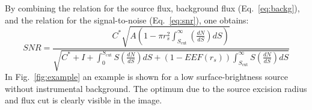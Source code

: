\documentclass[10pt,a4paper]{article}
\begin{document}
By combining the relation for the source flux, background flux (Eq.~\ref{eq:backg}), and the relation for the signal-to-noise (Eq.~\ref{eq:snr}), one obtains:
\begin{equation}
\newcommand{\one}{C^{*} \sqrt{A \left( 1 - \pi r_{s}^{2} \int_{S_{\mathrm{cut}}}^{\infty} \left(\frac{dN}{dS}\right) dS \right)}}
\newcommand{\two}{\sqrt{C^* + I + \int_{0}^{S_{\mathrm{cut}}} S \left(\frac{dN}{dS}\right) dS + \left(1 - EEF(r_s)\right) \int_{S_{\mathrm{cut}}}^{\infty} S \left( \frac{dN}{dS} \right) dS}}
SNR = \frac{\one}{\two}
\end{equation}
In Fig.~\ref{fig:example} an example is shown for a low surface-brightness source without instrumental background. The optimum due to the source excision radius and flux cut is clearly visible in the image.




\end{document}
